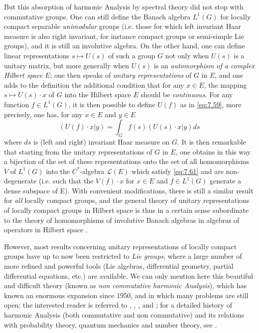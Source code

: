 \documentclass[12pt,a4paper,leqno,twoside]{extbook}
\begin{document}
But this absorption of harmonic Analysis by spectral theory did not stop with commutative groups. One can still define the Banach algebra \(L^1(G)\) for locally compact separable \emph{unimodular} groups (i.e. those for which left invariant Haar measure is also right invariant, for instance compact groups or semi-simple Lie groups), and it is still an involutive algebra. On the other hand, one can define linear representations \(s \mapsto U(s)\) of such a group \(G\) not only when \(U(s)\) is a unitary matrix, but more generally when \(U(s)\) is an \emph{automorphism of a complex Hilbert space} \(E\); one then speaks of \emph{unitary representations} of \(G\) in \(E\), and one adds to the definition the additional condition that for any \(x \in E\), the mapping \(s \mapsto U(s) \cdot x\) of \(G\) into the Hilbert space \(E\) should be \emph{continuous}. For any function \(f \in L^1(G)\), it is then possible to define \(U(f)\) as in \eqref{eq:7.59}, more precisely, one has, for any \(x \in E\) and \(y \in E\)
\begin{equation}
    \label{eq:7.64}
    (U(f) \cdot x | y) = \int_G f(s) (U(s) \cdot x | y) ds
\end{equation}
where \(ds\) is (left and right) invariant Haar measure on \(G\). It is then remarkable that starting from the unitary representations of \(G\) in \(E\), one obtains in this way a bijection of the set of these representations onto the set of all homomorphisms \(V\) of \(L^1(G)\) into the \(C^*\)-algebra \(\mathcal{L}(E)\) which satisfy \eqref{eq:7.61} and are non-degenerate (i.e. such that the \(V(f) \cdot x\) for \(x \in E\) and \(f \in L^1(G)\) generate a dense subspace of E). With convenient modifications, there is still a similar result for \emph{all} locally compact groups, and the general theory of unitary representations of locally compact groups in Hilbert space is thus in a certain sense subordinate to the theory of homomorphisms of involutive Banach algebras in algebras of operators in Hilbert space \cite{058}.

However, most results concerning unitary representations of locally compact groups have up to now been restricted to \emph{Lie groups}, where a large number of more refined and powerful tools (Lie algebras, differential geometry, partial differential equations, etc.) are available. We can only mention here this beautiful and difficult theory (known as \emph{non commutative harmonic Analysis}), which has known an enormous expansion since 1950, and in which many problems are still open; the interested reader is referred to \cite{032}, \cite{043}, \cite{152}, \cite{217} and \cite{223}; for a detailed history of harmonic Analysis (both commutative and non commutative) and its relations with probability theory, quantum mechanics and number theory, see \cite{155}.
\end{document}
